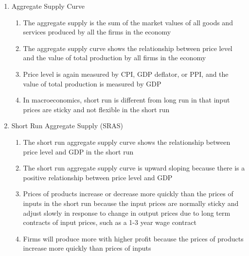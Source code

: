 \documentclass[12pt]{article}
\begin{document}
\begin{enumerate}
\begin{enumerate}
\begin{enumerate}
            \end{enumerate}

        \end{enumerate}

      \item Aggregate Supply Curve

        \begin{enumerate}

          \item The aggregate supply is the sum of the market values of all goods and services produced by all the firms in the economy

          \item The aggregate supply curve shows the relationship between price level and the value of total production by all firms in the economy

          \item Price level is again measured by CPI, GDP deflator, or PPI, and the value of total production is measured by GDP

          \item In macroeconomics, short run is different from long run in that input prices are sticky and not flexible in the short run

        \end{enumerate}

      \item Short Run Aggregate Supply (SRAS)

        \begin{enumerate}

          \item The short run aggregate supply curve shows the relationship between price level and GDP in the short run

          \item The short run aggregate supply curve is upward sloping because there is a positive relationship between price level and GDP

          \item Prices of products increase or decrease more quickly than the prices of inputs in the short run because the input prices are normally sticky and adjust slowly in response to change in output prices due to long term contracts of input prices, such as a 1-3 year wage contract

          \item Firms will produce more with higher profit because the prices of products increase more quickly than prices of inputs


\end{enumerate}
\end{enumerate}
\end{document}
